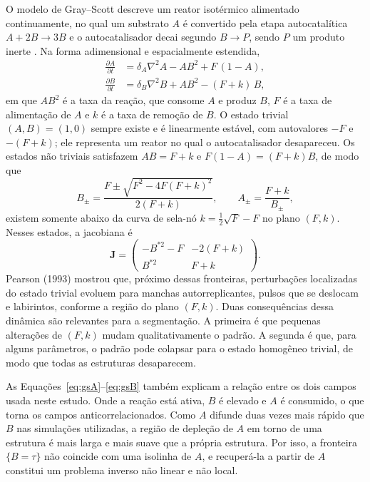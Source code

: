 \documentclass[12pt]{article}
\begin{document}
O modelo de Gray--Scott descreve um reator isotérmico alimentado continuamente, no qual um substrato $A$ é convertido pela etapa autocatalítica $A+2B\rightarrow 3B$ e o autocatalisador decai segundo $B\rightarrow P$, sendo $P$ um produto inerte \cite{gray1983,gray1984}. Na forma adimensional e espacialmente estendida,
\begin{align}
\frac{\partial A}{\partial t} &= \delta_A\nabla^2 A - A B^2 + F\,(1-A), \label{eq:gsA}\\
\frac{\partial B}{\partial t} &= \delta_B\nabla^2 B + A B^2 - (F+k)\,B, \label{eq:gsB}
\end{align}
em que $AB^2$ é a taxa da reação, que consome $A$ e produz $B$, $F$ é a taxa de alimentação de $A$ e $k$ é a taxa de remoção de $B$. O estado trivial $(A,B)=(1,0)$ sempre existe e é linearmente estável, com autovalores $-F$ e $-(F+k)$; ele representa um reator no qual o autocatalisador desapareceu. Os estados não triviais satisfazem $AB=F+k$ e $F(1-A)=(F+k)B$, de modo que
\begin{equation}
B_\pm=\frac{F\pm\sqrt{F^2-4F(F+k)^2}}{2(F+k)},\qquad A_\pm=\frac{F+k}{B_\pm},
\end{equation}
existem somente abaixo da curva de sela-nó $k=\tfrac12\sqrt{F}-F$ no plano $(F,k)$. Nesses estados, a jacobiana é
\begin{equation}
\mathbf{J}=\begin{pmatrix} -B^{*2}-F & -2(F+k)\\ B^{*2} & F+k\end{pmatrix}.
\end{equation}
Pearson (1993) mostrou que, próximo dessas fronteiras, perturbações localizadas do estado trivial evoluem para manchas autorreplicantes, pulsos que se deslocam e labirintos, conforme a região do plano $(F,k)$. Duas consequências dessa dinâmica são relevantes para a segmentação. A primeira é que pequenas alterações de $(F,k)$ mudam qualitativamente o padrão. A segunda é que, para alguns parâmetros, o padrão pode colapsar para o estado homogêneo trivial, de modo que todas as estruturas desaparecem.

As Equações~\eqref{eq:gsA}--\eqref{eq:gsB} também explicam a relação entre os dois campos usada neste estudo. Onde a reação está ativa, $B$ é elevado e $A$ é consumido, o que torna os campos anticorrelacionados. Como $A$ difunde duas vezes mais rápido que $B$ nas simulações utilizadas, a região de depleção de $A$ em torno de uma estrutura é mais larga e mais suave que a própria estrutura. Por isso, a fronteira $\{B=\tau\}$ não coincide com uma isolinha de $A$, e recuperá-la a partir de $A$ constitui um problema inverso não linear e não local.
\end{document}
